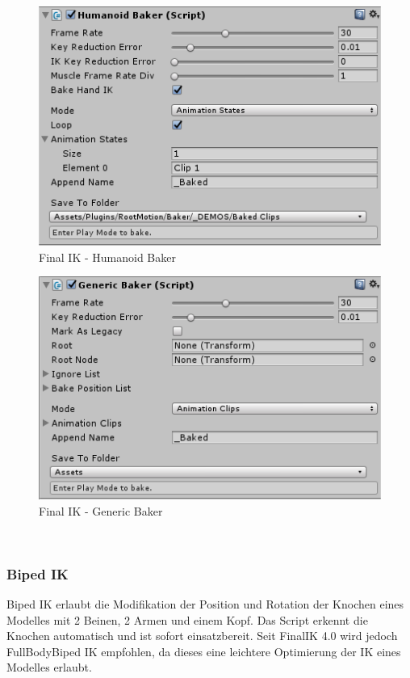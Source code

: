 \begin {figure}
    \centering
    \includegraphics[scale=1]{pics/finalik_baker_HumanoidBakerComponent}
    \caption{Final IK - Humanoid Baker}
    \label{fig:finalIK_humanoid_baker}
\end {figure}
\begin {figure}
    \centering
    \includegraphics[scale=1]{pics/finalik_baker_GenericBakerComponent}
    \caption{Final IK - Generic Baker}
    \label{fig:finalIK_generic_baker}
\end {figure}
~\cite{FinalIK_Baker_2021}

\subsubsection{Biped IK}
Biped IK erlaubt die Modifikation der Position und Rotation der Knochen eines Modelles mit 2 Beinen, 2 Armen und einem Kopf.
Das Script erkennt die Knochen automatisch und ist sofort einsatzbereit.
Seit FinalIK 4.0 wird jedoch FullBodyBiped IK empfohlen, da dieses eine leichtere Optimierung der IK eines Modelles erlaubt.

